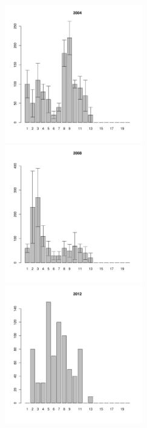 \begin{figure}[h]

\begin{multicols}{3}
\hfill
\includegraphics[width=60mm]{../White_Sea/Luvenga_Goreliy/midlow_2004_.pdf}
\hfill
\includegraphics[width=60mm]{../White_Sea/Luvenga_Goreliy/midlow_2008_.pdf}
\hfill
\includegraphics[width=60mm]{../White_Sea/Luvenga_Goreliy/midlow_2012_.pdf}
\end{multicols}




\end{figure}
